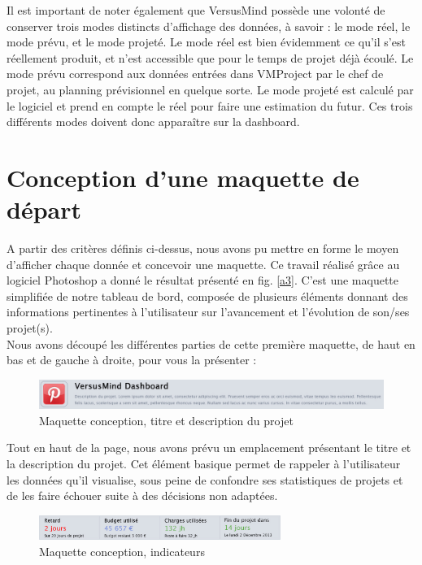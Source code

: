\documentclass[12pt]{report}
\begin{document}
Il est important de noter également que VersusMind possède une volonté de conserver trois modes distincts d’affichage des données, à savoir : le mode réel, le mode prévu, et le mode projeté. Le mode réel est bien évidemment ce qu’il s’est réellement produit, et n’est accessible que pour le temps de projet déjà écoulé. Le mode prévu correspond aux données entrées dans VMProject par le chef de projet, au planning prévisionnel en quelque sorte. Le mode projeté est calculé par le logiciel et prend en compte le réel pour faire une estimation du futur. Ces trois différents modes doivent donc apparaître sur la dashboard.\\

	\section{Conception d'une maquette de départ}
	
A partir des critères définis ci-dessus, nous avons pu mettre en forme le moyen d’afficher chaque donnée et concevoir une maquette. Ce travail réalisé grâce au logiciel Photoshop a donné le résultat présenté en fig. \ref{a3}. C'est une maquette simplifiée de notre tableau de bord, composée de plusieurs éléments donnant des informations pertinentes à l'utilisateur sur l'avancement et l'évolution de son/ses projet(s).\\

Nous avons découpé les différentes parties de cette première maquette, de haut en bas et de gauche à droite, pour vous la présenter :\\

\begin{figure}[H]
	\centering
	\includegraphics[width=1\textwidth]{pictures/notreMaquette/description.jpg}
	\caption{Maquette conception, titre et description du projet}
	\label{5}
\end{figure}


Tout en haut de la page, nous avons prévu un emplacement présentant le titre et la description du projet. Cet élément basique permet de rappeler à l'utilisateur les données qu'il visualise, sous peine de confondre ses statistiques de projets et de les faire échouer suite à des décisions non adaptées.\\

\begin{figure}[H]
	\centering
	\includegraphics[width=0.7\textwidth]{pictures/notreMaquette/chiffresCle.jpg}
	\caption{Maquette conception, indicateurs}
	\label{6}
\end{figure}
\end{document}
